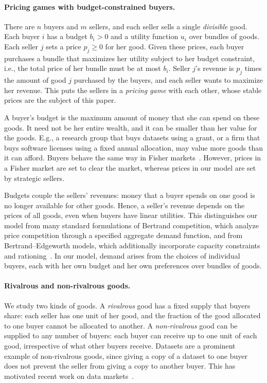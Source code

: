 \paragraph{Pricing games with budget-constrained buyers.}
There are $n$ buyers and $m$ sellers, and each seller sells a single \emph{divisible} good.
Each buyer $i$ has a budget $b_i > 0$ and a utility function $u_i$ over bundles of goods.
Each seller $j$ sets a price $p_j \ge 0$ for her good.
Given these prices, each buyer purchases a bundle that maximizes her utility
subject to her budget constraint, i.e., the total price of her bundle must be at most $b_i$.
Seller $j$'s revenue is $p_j$ times the amount of good $j$ purchased by the buyers,
and each seller wants to maximize her revenue.
This puts the sellers in a \emph{pricing game} with each other,
whose stable prices are the subject of this paper.

A buyer's budget is the maximum amount of money that she can spend on these goods. It need not be her entire wealth, and it can be smaller than her value for the goods. E.g., a research group that buys datasets using a grant,
or a firm that buys software licenses using a fixed annual allocation, may value more goods than it can afford.
Buyers behave the same way in Fisher markets~\cite{EisenbergGale1959,Devanur2008}. However, prices in a Fisher market are set to clear the market, whereas prices in our model are set by strategic sellers.

Budgets couple the sellers' revenues:
money that a buyer spends on one good is no longer available for other goods.
Hence, a seller's revenue depends on the prices of all goods, even when buyers have linear utilities.
This distinguishes our model from many standard formulations of Bertrand competition,
which analyze price competition through a specified aggregate demand function,
and from Bertrand--Edgeworth models, which additionally incorporate capacity constraints
and rationing~\cite{Bertrand1883,Edgeworth1897,KrepsScheinkman1983}.
In our model, demand arises from the choices of individual buyers,
each with her own budget and her own preferences over bundles of goods.

\paragraph{Rivalrous and non-rivalrous goods.}
We study two kinds of goods.
A \emph{rivalrous} good has a fixed supply that buyers share:
each seller has one unit of her good,
and the fraction of the good allocated to one buyer cannot be allocated to another.
A \emph{non-rivalrous} good can be supplied to any number of buyers:
each buyer can receive up to one unit of each good, irrespective of what other buyers receive.
Datasets are a prominent example of non-rivalrous goods,
since giving a copy of a dataset to one buyer does not prevent the seller
from giving a copy to another buyer.
This has motivated recent work on data markets~\cite{JonesTonetti2020,chaudhury2026equilibrium}.

